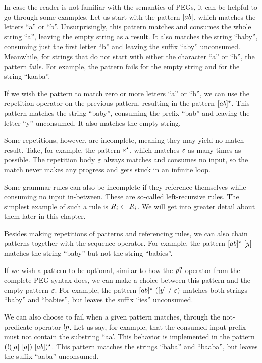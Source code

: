 In case the reader is not familiar with the semantics of PEGs,
it can be helpful to go through some examples.
Let us start with the pattern $[ab]$,
which matches the letters ``a'' or ``b''.
Unsurprisingly,
this pattern matches and consumes
the whole string ``a'',
leaving the empty string as a result.
It also matches the string ``baby'',
consuming just the first letter ``b''
and leaving the suffix ``aby'' unconsumed.
Meanwhile, for strings that do not start
with either the character ``a'' or ``b'',
the pattern fails.
For example, the pattern fails for the empty string
and for the string ``kaaba''.

If we wish the pattern to match zero or more letters ``a'' or ``b'',
we can use the repetition operator on the previous pattern,
resulting in the pattern $[ab]^\star$.
This pattern matches the string ``baby'',
consuming the prefix ``bab''
and leaving the letter ``y'' unconsumed.
It also matches the empty string.

Some repetitions, however, are incomplete,
meaning they may yield no match result.
Take, for example, the pattern $\varepsilon^\star$,
which matches $\varepsilon$ as many times as possible.
The repetition body $\varepsilon$ always matches and consumes no input,
so the match never makes any progress and gets stuck in an infinite loop.

Some grammar rules can also be incomplete
if they reference themselves
while consuming no input in-between.
These are so-called left-recursive rules.
The simplest example of such a rule is $R_{i} \leftarrow R_{i}$.
We will get into greater detail about them later in this chapter.

Besides making repetitions of patterns
and referencing rules,
we can also chain patterns together
with the sequence operator.
For example,
the pattern $[ab]^\star\ [y]$
matches the string ``baby'' but not the string ``babies''.

If we wish a pattern to be optional,
similar to how the $p?$ operator from the
complete PEG syntax does,
we can make a choice between this pattern
and the empty pattern $\varepsilon$.
For example,
the pattern $[ab]^\star\ ([y]\ /\ \varepsilon)$
matches both strings ``baby'' and ``babies'',
but leaves the suffix ``ies'' unconsumed.

We can also choose to fail when a given pattern matches,
through the not-predicate operator $!p$.
Let us say, for example,
that the consumed input prefix
must not contain the substring ``aa'.
This behavior is implemented in the pattern
$(!([a]\ [a])\ [ab])^\star$.
This pattern matches the strings ``baba'' and ``baaba'',
but leaves the suffix ``aaba'' unconsumed.

